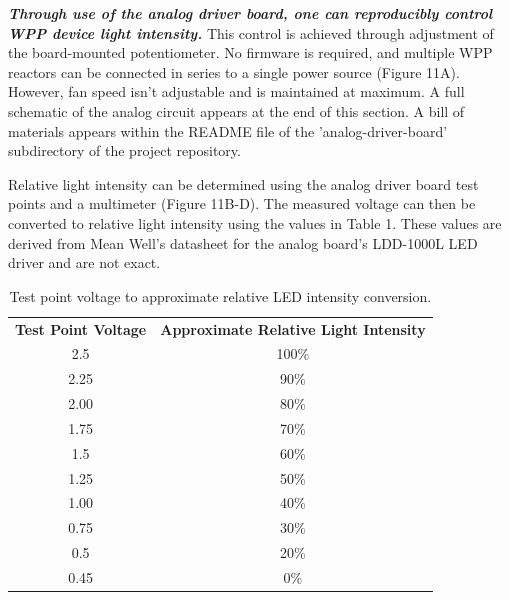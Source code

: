 \documentclass[11pt]{article}
\begin{document}
\textbf{\textit{Through use of the analog driver board, one can reproducibly control WPP device light intensity.}}
This control is achieved through adjustment of the board-mounted potentiometer.
No firmware is required, and multiple WPP reactors can be connected in series to a single power source (Figure 11A).
However, fan speed isn’t adjustable and is maintained at maximum.
A full schematic of the analog circuit appears at the end of this section.
A bill of materials appears within the README file of the 'analog-driver-board' subdirectory of the project repository.

Relative light intensity can be determined using the analog driver board test points and a multimeter (Figure 11B-D).
The measured voltage can then be converted to relative light intensity using the values in Table 1.
These values are derived from Mean Well's datasheet for the analog board’s LDD-1000L LED driver and are not exact.

\begin{table}[H]
	\centering
	\begin{tabular}{cc}
		\centering
		\textbf{Test Point Voltage} & \textbf{Approximate Relative Light Intensity} \\
		2.5                         & 100\%                                         \\
		2.25                        & 90\%                                          \\
		2.00                        & 80\%                                          \\
		1.75                        & 70\%                                          \\
		1.5                         & 60\%                                          \\
		1.25                        & 50\%                                          \\
		1.00                        & 40\%                                          \\
		0.75                        & 30\%                                          \\
		0.5                         & 20\%                                          \\
		0.45                        & 0\%
	\end{tabular}
	\caption{Test point voltage to approximate relative LED intensity conversion.}
	\label{tab:analog-board-conversion}
\end{table}
\end{document}
